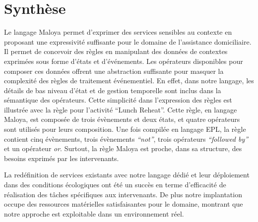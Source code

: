\section{Synthèse}
Le langage Maloya permet d'exprimer des services sensibles au contexte en proposant une expressivité suffisante pour le domaine de l'assistance domiciliaire. Il permet de concevoir des règles en manipulant des données de contextes exprimées sous forme d'états et d'événements. Les opérateurs disponibles pour composer ces données offrent une abstraction suffisante pour masquer la complexité des règles de traitement événementiel. En effet, dans notre langage, les détails de bas niveau d’état et de gestion temporelle sont inclus dans la sémantique des opérateurs. Cette simplicité dans l'expression des règles est illustrée avec  la règle pour l'activité ``Lunch Reheat''. Cette règle, en langage Maloya, est composée de trois évènements et deux états, et quatre opérateurs sont utilisés pour leurs composition. Une fois compilée en langage EPL, la règle contient cinq évènements, trois évènements {\it ``not''}, trois opérateurs {\it ``followed by''} et un opérateur {\it or}. Surtout, la règle Maloya est proche, dans sa structure, des besoins exprimés par les intervenants.

La redéfinition de services existants avec notre langage dédié et leur déploiement dans des conditions écologiques ont été un succès en terme d'efficacité
de réalisation des tâches spécifiques aux intervenants. De plus notre implantation occupe des ressources matérielles satisfaisantes pour le domaine, montrant que notre approche est exploitable dans un environnement réel.
